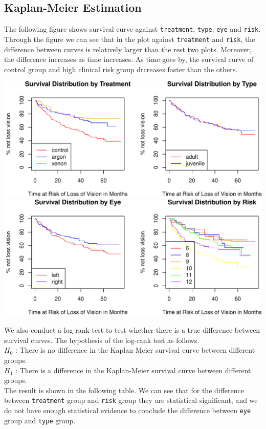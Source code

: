 \documentclass[
]{article}
\begin{document}
\hypertarget{kaplan-meier-estimation}{%
\subsection{Kaplan-Meier Estimation}\label{kaplan-meier-estimation}}

The following figure shows survival curve against \texttt{treatment},
\texttt{type}, \texttt{eye} and \texttt{risk}. Through the figure we can
see that in the plot against \texttt{treatment} and \texttt{risk}, the
difference between curves is relatively larger than the rest two plots.
Moreover, the difference increases as time increases. As time goes by,
the survival curve of control group and high clinical risk group
drcreases faster than the others.

\includegraphics{stats504_hw2_files/figure-latex/unnamed-chunk-2-1.pdf}
\includegraphics{stats504_hw2_files/figure-latex/unnamed-chunk-2-2.pdf}

We also conduct a log-rank test to test whether there is a true
difference between survival curves. The hypothesis of the log-rank test
as follows.\\
\(H_0\) : There is no difference in the Kaplan-Meier survival curve
between different groups.\\
\(H_1\) : There is a difference in the Kaplan-Meier survival curve
between different groups.\\
The result is shown in the following table. We can see that for the
difference between \texttt{treatment} group and \texttt{risk} group they
are statistical significant, and we do not have enough statistical
evidence to conclude the difference between \texttt{eye} group and
\texttt{type} group.
\end{document}
